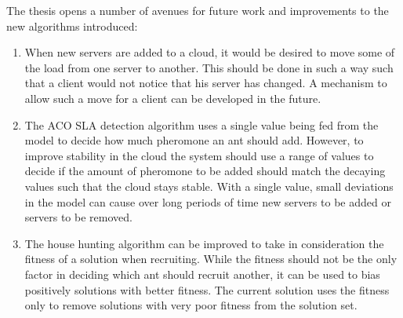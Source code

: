 The thesis opens a number of avenues for future work and improvements to the new algorithms introduced:

\begin{enumerate}
	\item When new servers are added to a cloud, it would be desired to move some of the load from one server to another. This should be done in such a way such that a client would not notice that his server has changed. A mechanism to allow such a move for a client can be developed in the future.
	\item The ACO SLA detection algorithm uses a single value being fed from the model to decide how much pheromone an ant should add. However, to improve stability in the cloud the system should use a range of values to decide if the amount of pheromone to be added should match the decaying values such that the cloud stays stable. With a single value, small deviations in the model can cause over long periods of time new servers to be added or servers to be removed.
	\item The house hunting algorithm can be improved to take in consideration the fitness of a solution when recruiting. While the fitness should not be the only factor in deciding which ant should recruit another, it can be used to bias positively solutions with better fitness. The current solution uses the fitness only to remove solutions with very poor fitness from the solution set.
\end{enumerate}